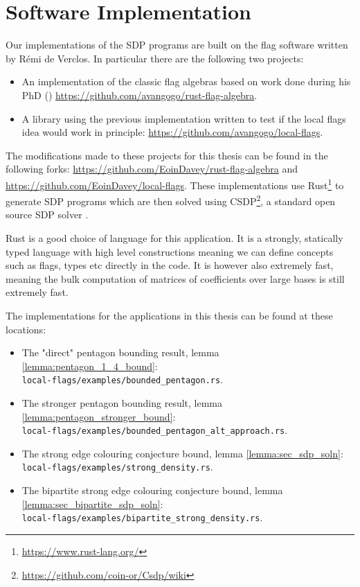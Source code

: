 \chapter{Software Implementation}
\label{app:flag_software}

Our implementations of the SDP programs are built on the flag software written by
Rémi de Verclos. In particular there are the following two projects:
\begin{itemize}
    \item An implementation of the classic flag algebras based on work done during his
        PhD (\cite{deverclosApplicationsLimitsCombinatorial2016})
        \url{https://github.com/avangogo/rust-flag-algebra}.
    \item A library using the previous implementation written to test if the local flags idea
        would work in principle: \url{https://github.com/avangogo/local-flags}.
\end{itemize}

The modifications made to these projects for this thesis can be found in the following forks:
\url{https://github.com/EoinDavey/rust-flag-algebra} and\\
\url{https://github.com/EoinDavey/local-flags}.
These implementations use Rust\footnote{\url{https://www.rust-lang.org/}} to generate SDP programs which are
then solved using CSDP\footnote{\url{https://github.com/coin-or/Csdp/wiki}},
a standard open source SDP solver
\cite{borchersCSDPLibrarySemidefinite1999}.

\begin{note}
    Rust is a good choice of language for this application. It is a strongly, statically typed
    language with high level constructions meaning we can define concepts such as flags, types
    etc directly in the code. It is however also extremely fast, meaning the bulk computation
    of matrices of coefficients over large bases is still extremely fast.
\end{note}

The implementations for the applications in this thesis can be found at these locations:
\begin{itemize}
    \item The "direct" pentagon bounding result, lemma
        \ref{lemma:pentagon_1_4_bound}:\\
        \verb|local-flags/examples/bounded_pentagon.rs|.
    \item The stronger pentagon bounding result, lemma
        \ref{lemma:pentagon_stronger_bound}:\\
        \verb|local-flags/examples/bounded_pentagon_alt_approach.rs|.
    \item The strong edge colouring conjecture bound, lemma
        \ref{lemma:sec_sdp_soln}:\\
        \verb|local-flags/examples/strong_density.rs|.
    \item The bipartite strong edge colouring conjecture bound, lemma
        \ref{lemma:sec_bipartite_sdp_soln}:\\
        \verb|local-flags/examples/bipartite_strong_density.rs|.
\end{itemize}

